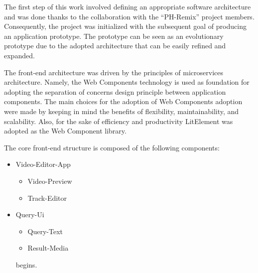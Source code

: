 The first step of this work involved defining an appropriate software architecture and was done thanks to the collaboration with the “PH-Remix” project members. Consequently, the project was initialized with the subsequent goal of producing an application prototype. The prototype can be seen as an evolutionary prototype due to the adopted architecture that can be easily refined and expanded.

The front-end architecture was driven by the principles of microservices architecture. Namely, the Web Components technology is used as foundation for adopting the separation of concerns design principle between application components. The main choices for the adoption of Web Components adoption were made by keeping in mind the benefits of flexibility, maintainability, and scalability. Also, for the sake of efficiency and productivity LitElement was adopted as the Web Component library.

The core front-end structure is composed of the following components: 

\begin{itemize}
\item Video-Editor-App
    \begin{itemize}
        \item Video-Preview
        \item Track-Editor
    \end{itemize}
\item Query-Ui
    \begin{itemize}
        \item Query-Text
        \item Result-Media
    \end{itemize} begins.
\end{itemize}

